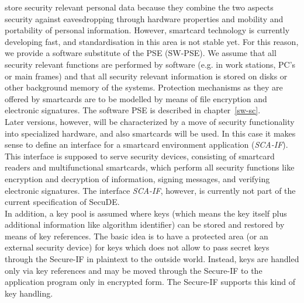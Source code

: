 store security relevant personal data because they combine the two aspects
\bi
\m security against eavesdropping through hardware properties and
\m mobility and portability of personal information.
\ei
However, smartcard technology
is currently developing fast, and standardisation in this area is not stable
yet. For this reason, we provide a software substitute of the PSE (SW-PSE). 
We assume that all security relevant functions are
performed by software (e.g. in work stations, PC's or main frames) and that all
security relevant information is stored on disks or other background memory
of the systems. Protection mechanisms as they are offered by smartcards are to
be modelled by means of file encryption and electronic signatures.
The software PSE is described in chapter~\ref{sw-sc}. \\  [1ex]
Later versions, however, will be characterized by a move of security functionality
into specialized hardware, and also smartcards will be used. In this case it
makes sense to define an interface for a smartcard environment application ({\em SCA-IF}).
This interface is supposed to serve security devices, consisting of smartcard
readers and multifunctional smartcards, which perform all security functions
like encryption and decryption of information, signing messages, and verifying
electronic signatures. The interface {\em SCA-IF}, however, is currently not part of the
current specification of SecuDE. \\ [1ex]
In addition, a key pool is assumed where keys (which means the key itself plus additional
information like algorithm identifier) can be stored and restored 
by means of key references. The basic idea is
to have a protected area (or an external security device) for keys which does not allow
to pass secret keys through the Secure-IF in plaintext to the outside world. 
Instead, keys are handled only via
key references and may be moved through the Secure-IF to the application program
only in encrypted form. The Secure-IF supports this kind of key handling.
\\ [1em]

